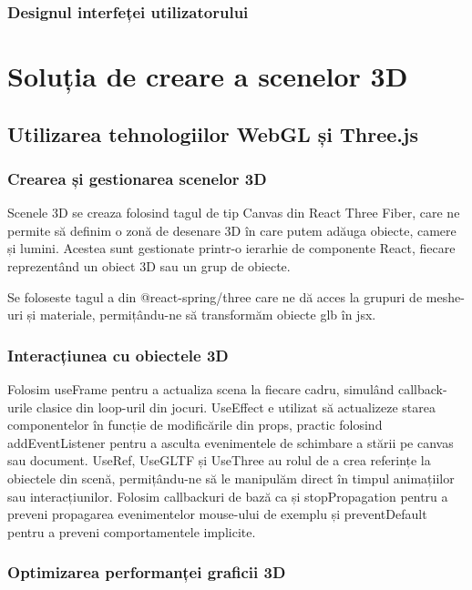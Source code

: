 \subsubsection{Designul interfeței utilizatorului}

\section{Soluția de creare a scenelor 3D}
\label{sec:proj-3d}
\subsection{Utilizarea tehnologiilor WebGL și Three.js}
\subsubsection{Crearea și gestionarea scenelor 3D}

Scenele 3D se creaza folosind tagul de tip Canvas din React Three Fiber, care
ne permite să definim o zonă de desenare 3D în care putem adăuga obiecte, camere și lumini.
Acestea sunt gestionate printr-o ierarhie de componente React, fiecare reprezentând un obiect 3D
sau un grup de obiecte.

Se foloseste tagul a din @react-spring/three care ne dă acces la grupuri de meshe-uri și
materiale, permițându-ne să transformăm obiecte glb în jsx.

\subsubsection{Interacțiunea cu obiectele 3D}

Folosim useFrame pentru a actualiza scena la fiecare cadru, simulând callback-urile clasice
din loop-uril din jocuri. UseEffect e utilizat să actualizeze starea componentelor în funcție de modificările 
din props, practic folosind addEventListener pentru a asculta evenimentele de schimbare a stării pe canvas
sau document. UseRef, UseGLTF și UseThree au rolul de a crea referințe la obiectele din scenă,
permițându-ne să le manipulăm direct în timpul animațiilor sau interacțiunilor. Folosim callbackuri
de bază ca și stopPropagation pentru a preveni propagarea evenimentelor mouse-ului de exemplu și 
preventDefault pentru a preveni comportamentele implicite.

\subsubsection{Optimizarea performanței graficii 3D}

